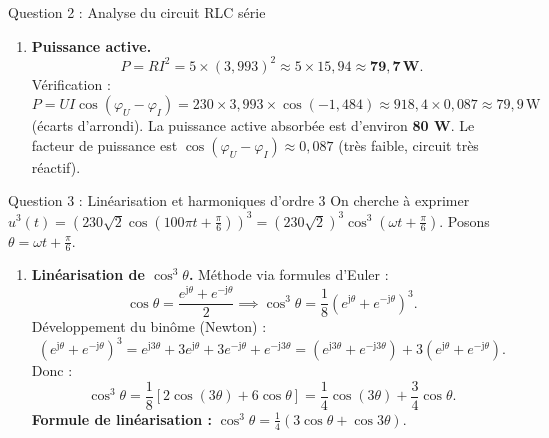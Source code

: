 \documentclass[11pt]{article}
\begin{document}
\begin{exoresolu}{Question 2 : Analyse du circuit RLC série}
\begin{enumerate}
    \item \textbf{Puissance active.}
    \[
    P = R I^2 = 5 \times (3,993)^2 \approx 5 \times 15,94 \approx \mathbf{79,7\,\text{W}}.
    \]
    Vérification : $P = U I \cos(\varphi_U - \varphi_I) = 230 \times 3,993 \times \cos(-1,484) \approx 918,4 \times 0,087 \approx 79,9\,\text{W}$ (écarts d'arrondi).
    La puissance active absorbée est d'environ \textbf{80 W}. Le facteur de puissance est $\cos(\varphi_U - \varphi_I) \approx 0,087$ (très faible, circuit très réactif).
\end{enumerate}
\end{exoresolu}

\begin{exoresolu}{Question 3 : Linéarisation et harmoniques d'ordre 3}
On cherche à exprimer $u^3(t) = \left(230\sqrt{2} \cos(100\pi t + \tfrac{\pi}{6})\right)^3 = (230\sqrt{2})^3 \cos^3(\omega t + \tfrac{\pi}{6})$.
Posons $\theta = \omega t + \tfrac{\pi}{6}$.

\begin{enumerate}
    \item \textbf{Linéarisation de $\cos^3\theta$.}
    Méthode via formules d'Euler :
    \[
    \cos\theta = \frac{e^{\mathrm{j}\theta} + e^{-\mathrm{j}\theta}}{2} \implies \cos^3\theta = \frac{1}{8}(e^{\mathrm{j}\theta} + e^{-\mathrm{j}\theta})^3.
    \]
    Développement du binôme (Newton) :
    \[
    (e^{\mathrm{j}\theta} + e^{-\mathrm{j}\theta})^3 = e^{\mathrm{j}3\theta} + 3 e^{\mathrm{j}\theta} + 3 e^{-\mathrm{j}\theta} + e^{-\mathrm{j}3\theta} = (e^{\mathrm{j}3\theta} + e^{-\mathrm{j}3\theta}) + 3(e^{\mathrm{j}\theta} + e^{-\mathrm{j}\theta}).
    \]
    Donc :
    \[
    \cos^3\theta = \frac{1}{8}\left[ 2\cos(3\theta) + 6\cos\theta \right] = \frac{1}{4}\cos(3\theta) + \frac{3}{4}\cos\theta.
    \]
    \textbf{Formule de linéarisation :} $\boxed{\cos^3\theta = \frac{1}{4}(3\cos\theta + \cos 3\theta)}$.


\end{enumerate}
\end{exoresolu}
\end{document}
